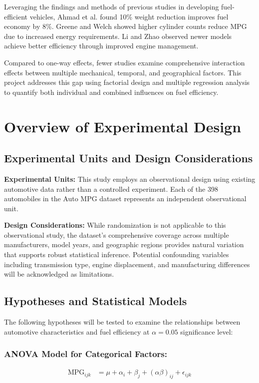 \documentclass[12pt]{article}
\begin{document}
Leveraging the findings and methods of previous studies in developing fuel-efficient vehicles,
Ahmad et al. \cite{ahmad2020} found 10\% weight reduction improves fuel economy by 8\%. 
Greene and Welch \cite{greene2017} showed higher cylinder counts reduce MPG due to increased energy requirements.
Li and Zhao \cite{li2022} observed newer models achieve better efficiency through improved engine management.



Compared to one-way effects, fewer studies examine comprehensive interaction effects between multiple mechanical, temporal, and geographical factors.
This project addresses this gap using factorial design and multiple regression analysis to quantify both individual and combined
influences on fuel efficiency.


\section{Overview of Experimental Design}


\subsection{Experimental Units and Design Considerations}

\textbf{Experimental Units:} This study employs an observational design using existing automotive data rather than a controlled experiment. 
Each of the 398 automobiles in the Auto MPG dataset represents an independent observational unit.


\textbf{Design Considerations:} While randomization is not applicable to this observational study, 
the dataset's comprehensive coverage across multiple manufacturers, model years, and geographic 
regions provides natural variation that supports robust statistical inference.
Potential confounding variables including transmission type, engine displacement, 
and manufacturing differences will be acknowledged as limitations. 
\subsection{Hypotheses and Statistical Models}

The following hypotheses will be tested to examine the relationships between automotive characteristics and fuel efficiency at $\alpha = 0.05$ significance level:


\subsubsection{ANOVA Model for Categorical Factors:}
\begin{align}
\text{MPG}_{ijk} &= \mu + \alpha_i + \beta_j + (\alpha\beta)_{ij} + \epsilon_{ijk}
\end{align}
\end{document}

